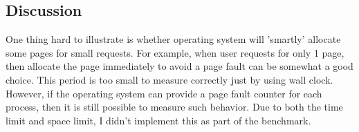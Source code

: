 \subsection{Discussion}
One thing hard to illustrate is whether operating system will 'smartly'
allocate some pages for small requests. For example, when user requests for
only 1 page, then allocate the page immediately to avoid a page fault can be
somewhat a good choice. This period is too small to measure correctly just by
using wall clock. However, if the operating system can provide a page fault
counter for each process, then it is still possible to measure such behavior.
Due to both the time limit and space limit, I didn't implement this as part of
the benchmark.
